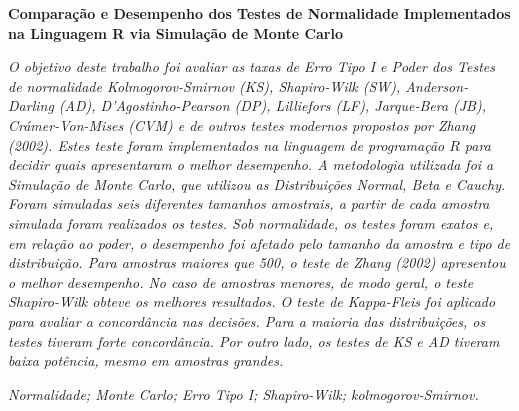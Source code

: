 \documentclass[a4paper,11pt]{article} %
\begin{document}
\pagestyle{fancy}
\setcounter{page}{1}
\renewcommand{\thefootnote}{$\dagger$}
\lfoot{}
\rfoot{}
\setpagewiselinenumbers
\modulolinenumbers[1]
\linenumbers

\begin{center}
    {\large {\bf Comparação e Desempenho dos Testes de Normalidade Implementados na Linguagem R via Simulação de Monte Carlo}}\vspace{0.3cm} 
\end{center}
\begin{small}
 { \it
    O objetivo deste trabalho foi avaliar as taxas de Erro Tipo I e Poder dos Testes de normalidade Kolmogorov-Smirnov (KS), Shapiro-Wilk (SW), Anderson-Darling (AD), D’Agostinho-Pearson (DP), Lilliefors (LF), Jarque-Bera (JB), Crámer-Von-Mises (CVM) e de outros testes modernos propostos por Zhang (2002). Estes teste foram implementados na linguagem de programação $R$ para decidir quais apresentaram o melhor desempenho. A metodologia utilizada foi a Simulação de Monte Carlo, que utilizou as Distribuições Normal, Beta e Cauchy. Foram simuladas seis diferentes tamanhos amostrais, a partir de cada amostra simulada foram realizados os testes. Sob normalidade, os testes foram exatos e, em relação ao poder, o desempenho foi afetado pelo tamanho da amostra e tipo de distribuição. Para amostras maiores que 500, o teste de Zhang (2002) apresentou o melhor desempenho. No caso de amostras menores, de modo geral, o teste Shapiro-Wilk obteve os melhores resultados. O teste de Kappa-Fleis foi aplicado para avaliar a concordância nas decisões. Para a maioria das distribuições, os testes tiveram forte concordância. Por outro lado, os testes de KS e AD tiveram baixa potência, mesmo em amostras grandes.
}

\vspace{0.5cm}

 {\it Normalidade; Monte Carlo; Erro Tipo I; Shapiro-Wilk; kolmogorov-Smirnov.}\vspace{0.3cm}
\end{small}
\end{document}
